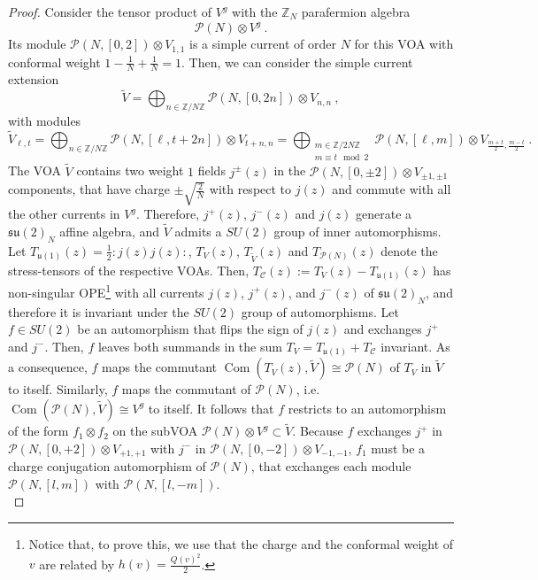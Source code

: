 \documentclass[11pt,reqno]{article}
\newcommand{\be}{\begin{equation}}
\newcommand{\ee}{\end{equation}}
\newcommand{\calC}{\mathcal{C}}
\DeclareMathOperator{\Com}{Com}
\newcommand{\ZZ}{\mathbb{Z}}
\newcommand{\paraf}{\mathcal{P}}
\newcommand{\normord}[1]{:\mathrel{ #1}:}
\newcommand{\alg}[1]{\mathfrak{#1}}
\begin{document}
\begin{proof}
	Consider the tensor product of $V^g$ with the $\ZZ_N$ parafermion algebra
	\be \paraf(N)\otimes V^g \ .
	\ee Its module $\paraf(N,[0,2])\otimes V_{1,1}$ is a simple current of order $N$ for this VOA with conformal weight $1-\frac{1}{N}+\frac{1}{N}=1$. Then, we can consider the simple current extension
	\be \tilde V=\bigoplus_{n\in \ZZ/N\ZZ} \paraf(N,[0,2n])\otimes V_{n,n}
	 \ ,
	\ee with modules
	\be \tilde V_{\ell,t}=\bigoplus_{n\in \ZZ/N\ZZ} \paraf(N,[\ell,t+2n])\otimes V_{t+n,n}=\bigoplus_{\substack{m\in \ZZ/2N\ZZ\\ m\equiv t\mod 2}} \paraf(N,[\ell,m])\otimes V_{\frac{m+t}{2},\frac{m-t}{2}}
	\ .
	\ee The VOA $\tilde V$ contains two weight $1$ fields $j^\pm(z)$ in the $\paraf(N,[0,\pm 2])\otimes V_{\pm 1,\pm 1}$ components, that have charge $\pm\sqrt{\frac{2}{N}}$ with respect to $j(z)$ and commute with all the other currents in $V^g$. Therefore, $j^+(z)$, $j^-(z)$ and $j(z)$ generate a $\alg{su}(2)_N$ affine algebra, and $\tilde V$ admits a $SU(2)$ group of inner automorphisms. Let $T_{\alg{u}(1)}(z)=\frac{1}{2}\normord{j(z)j(z)}$, $T_V(z)$,  $T_{\tilde V}(z)$ and $T_{\paraf(N)}(z)$ denote the stress-tensors of the respective VOAs. Then, $T_\calC(z):=T_V(z)-T_{\alg{u}(1)}(z)$ has non-singular OPE\footnote{ Notice that, to prove this, we use that the charge and the conformal weight of $v$ are related by $h(v)=\frac{Q(v)^2}{2}$.} with all currents $j(z)$, $j^+(z)$, and $j^-(z)$ of $\alg{su}(2)_N$, and therefore it is invariant under the $SU(2)$ group of automorphisms. Let $f\in SU(2)$ be an automorphism that flips the sign of $j(z)$ and exchanges $j^+$ and $j^-$. Then, $f$ leaves both summands in the sum $T_V=T_{\alg{u}(1)}+T_\calC$ invariant. As a consequence, $f$  maps the commutant $\Com(T_V(z),\tilde V)\cong \paraf(N)$ of $T_V$ in $\tilde V$ to itself. Similarly, $f$ maps the commutant of $\paraf(N)$, i.e. $\Com( \paraf(N),\tilde V)\cong V^g$ to itself. It follows that $f$ restricts to an automorphism of the form $f_1\otimes f_2$ on the subVOA $\paraf(N)\otimes V^g\subset \tilde V$. Because $f$ exchanges $j^+$ in $\paraf(N,[0,+2])\otimes V_{+ 1,+ 1}$ with  $j^-$ in $\paraf(N,[0,-2])\otimes V_{- 1,- 1}$, $f_1$ must be a charge conjugation automorphism of $\paraf(N)$, that exchanges each module $\paraf(N,[l,m])$ with $\paraf(N,[l,-m])$.\\

\end{proof}
\end{document}
